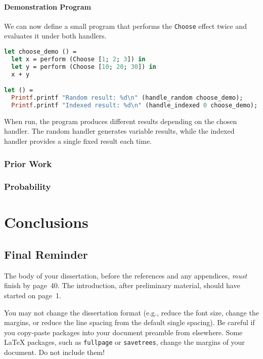 \documentclass[logo,bsc,singlespacing,parskip,online]{infthesis}
\begin{document}
\subsubsection{Demonstration Program}

We can now define a small program that performs the \texttt{Choose} effect twice and evaluates it under both handlers.

\begin{lstlisting}[language=OCaml]
let choose_demo () =
  let x = perform (Choose [1; 2; 3]) in
  let y = perform (Choose [10; 20; 30]) in
  x + y

let () =
  Printf.printf "Random result: %d\n" (handle_random choose_demo);
  Printf.printf "Indexed result: %d\n" (handle_indexed 0 choose_demo);
\end{lstlisting}

When run, the program produces different results depending on the chosen handler. The random handler generates variable results, while the indexed handler provides a single fixed result each time.

\subsection{Prior Work}



\subsection{Probability}



\chapter{Conclusions}

\section{Final Reminder}

The body of your dissertation, before the references and any appendices,
\emph{must} finish by page~40. The introduction, after preliminary material,
should have started on page~1.

You may not change the dissertation format (e.g., reduce the font size, change
the margins, or reduce the line spacing from the default single spacing). Be
careful if you copy-paste packages into your document preamble from elsewhere.
Some \LaTeX{} packages, such as \texttt{fullpage} or \texttt{savetrees}, change
the margins of your document. Do not include them!
\end{document}
